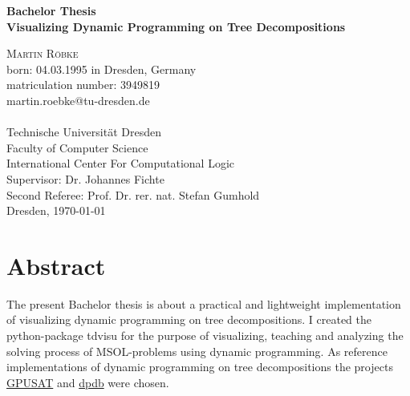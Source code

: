 \documentclass[a4paper, 12pt]{scrartcl}
\begin{document}
\begin{titlepage}
	\begin{center}
		{\Large\bfseries Bachelor Thesis}           \\[6.5ex]
		
		{\huge\bfseries Visualizing Dynamic Programming on Tree Decompositions}                  \\[6.5ex]
		
		\vspace{6ex}
				
		\textsc{\Large Martin Röbke}    \\[3ex]
		{\Large born: 04.03.1995 in Dresden, Germany}    \\[2ex]
		{\Large matriculation number: 3949819}    \\[2ex]
		{\Large martin.roebke@tu-dresden.de}    \\[2ex]
		\textsc{\large 
			}             \\[12ex]
		\vfill
		{\Large Technische Universität Dresden}               \\
		Faculty of Computer Science \\
		International Center For Computational Logic 		\\[5ex]
		
		{\Large Supervisor: Dr. Johannes Fichte}\\[2ex]
		{\Large Second Referee:  Prof. Dr. rer. nat. Stefan Gumhold}\\[5ex]
		
		\vfill
		Dresden, \today
	\end{center}
\end{titlepage}



\section*{Abstract}
\vspace{4ex}
The present Bachelor thesis is about a practical and lightweight implementation of visualizing dynamic programming on tree decompositions.
I created the python-package tdvisu for the purpose of visualizing, teaching and analyzing the solving process of MSOL-problems using dynamic programming.
As reference implementations of dynamic programming on tree decompositions the projects \href{https://github.com/daajoe/GPUSAT}{GPUSAT} and \href{https://github.com/hmarkus/dp_on_dbs}{dpdb} were chosen.
\end{document}
